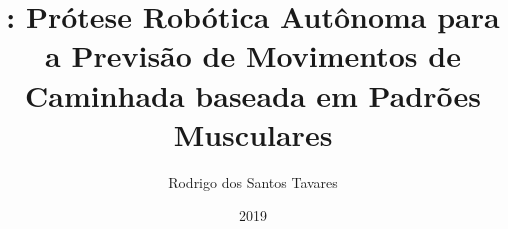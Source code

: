 \documentclass[
    12pt,       %
    oneside,    %
    a4paper,    %
%
    chapter=TITLE,	  	  %
%
    english,			  %
    brazil				  %
%
]{abntex2}
\title{\productname: Prótese Robótica Autônoma para a Previsão de Movimentos de Caminhada baseada em Padrões Musculares}
\author{Rodrigo dos Santos Tavares}
\date{2019}
\begin{document}


\imprimircapa{}

\imprimirfolhaderosto{}

\imprimirfolhadeaprovacao{}



\end{document}
